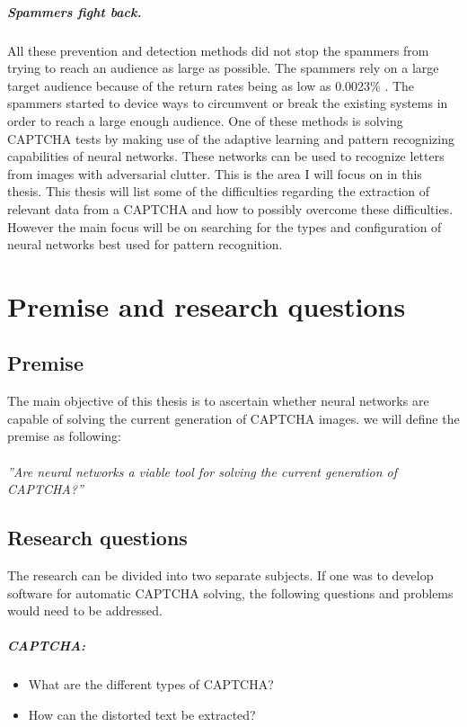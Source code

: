 \documentclass[pdftex,a4paper,12pt,twoside]{report}
\newcommand{\captcha}{CAPTCHA}
\begin{document}
\paragraph{Spammers fight back.}
All these prevention and detection methods did not stop the spammers from trying to reach an audience as large  as possible. The spammers rely on a large target audience because of the return rates being as low as 0.0023\% \citep{Cobb2003}. The spammers started to device ways to circumvent or break the existing systems in order to reach a large enough audience. One of these methods is solving CAPTCHA tests by making use of the adaptive learning and pattern recognizing capabilities of neural networks. These networks can be used to recognize letters from images with adversarial clutter.
This is the area I will focus on in this thesis. This thesis will list some of the difficulties regarding the extraction of relevant data from a CAPTCHA and how to possibly overcome these difficulties. However the main focus will be on searching for the types and configuration of neural networks best used for pattern recognition.
\chapter{Premise and research questions}
\label{ch:Premise}
\section{Premise}
\label{sec:Premise}
The main objective of this thesis is to ascertain whether neural networks are capable of solving the current generation of CAPTCHA images. we will define the premise  as following:\\\\
\emph{''Are neural networks a viable tool for solving the current generation of CAPTCHA?''}
\section{Research questions}
\label{sec:researquestions}
The research can be divided into two separate subjects. If one was to develop software for automatic CAPTCHA solving, the following questions and problems would need to be addressed.
\paragraph{\captcha :}
\begin{itemize}
\item What are the different types of CAPTCHA?
\item How can the distorted text be extracted?
\end{itemize}
\end{document}
